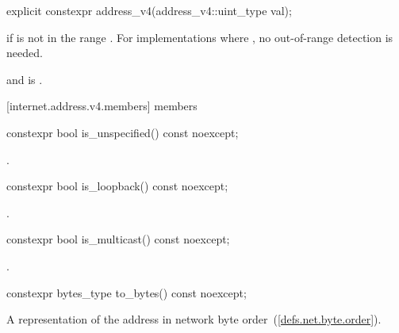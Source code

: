 \begin{itemdecl}
explicit constexpr address_v4(address_v4::uint_type val);
\end{itemdecl}

\begin{itemdescr}
\pnum
\remarks {} if  is not in the range \tcode{[0, 0xFFFFFFFF]}. \enternote For implementations where , no out-of-range detection is needed. \exitnote

\pnum
\postconditions {} and  is .
\end{itemdescr}



[internet.address.v4.members]{ members}

%
\begin{itemdecl}
constexpr bool is_unspecified() const noexcept;
\end{itemdecl}

\begin{itemdescr}
\pnum
\returns {}.
\end{itemdescr}

%
\begin{itemdecl}
constexpr bool is_loopback() const noexcept;
\end{itemdecl}

\begin{itemdescr}
\pnum
\returns {}.
\end{itemdescr}

%
\begin{itemdecl}
constexpr bool is_multicast() const noexcept;
\end{itemdecl}

\begin{itemdescr}
\pnum
\returns {}.
\end{itemdescr}

%
\begin{itemdecl}
constexpr bytes_type to_bytes() const noexcept;
\end{itemdecl}

\begin{itemdescr}
\pnum
\returns A representation of the address in network byte order~(\ref{defs.net.byte.order}).
\end{itemdescr}

